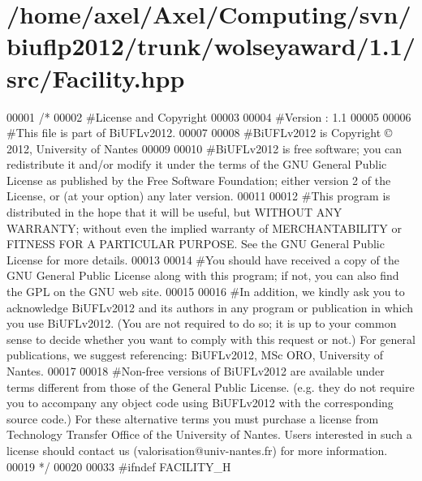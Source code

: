 \hypertarget{Facility_8hpp_source}{\section{/home/axel/\-Axel/\-Computing/svn/biuflp2012/trunk/wolseyaward/1.1/src/\-Facility.hpp}
}

\begin{DoxyCode}
00001 \textcolor{comment}{/*}
00002 \textcolor{comment}{ #License and Copyright}
00003 \textcolor{comment}{ }
00004 \textcolor{comment}{ #Version : 1.1}
00005 \textcolor{comment}{ }
00006 \textcolor{comment}{ #This file is part of BiUFLv2012.}
00007 \textcolor{comment}{ }
00008 \textcolor{comment}{ #BiUFLv2012 is Copyright © 2012, University of Nantes}
00009 \textcolor{comment}{ }
00010 \textcolor{comment}{ #BiUFLv2012 is free software; you can redistribute it and/or modify it under
       the terms of the GNU General Public License as published by the Free Software
       Foundation; either version 2 of the License, or (at your option) any later version.}
00011 \textcolor{comment}{ }
00012 \textcolor{comment}{ #This program is distributed in the hope that it will be useful, but WITHOUT
       ANY WARRANTY; without even the implied warranty of MERCHANTABILITY or FITNESS FOR
       A PARTICULAR PURPOSE. See the GNU General Public License for more details.}
00013 \textcolor{comment}{ }
00014 \textcolor{comment}{ #You should have received a copy of the GNU General Public License along with
       this program; if not, you can also find the GPL on the GNU web site.}
00015 \textcolor{comment}{ }
00016 \textcolor{comment}{ #In addition, we kindly ask you to acknowledge BiUFLv2012 and its authors in
       any program or publication in which you use BiUFLv2012. (You are not required to
       do so; it is up to your common sense to decide whether you want to comply with
       this request or not.) For general publications, we suggest referencing: 
       BiUFLv2012, MSc ORO, University of Nantes.}
00017 \textcolor{comment}{ }
00018 \textcolor{comment}{ #Non-free versions of BiUFLv2012 are available under terms different from
       those of the General Public License. (e.g. they do not require you to accompany any
       object code using BiUFLv2012 with the corresponding source code.) For these
       alternative terms you must purchase a license from Technology Transfer Office of the
       University of Nantes. Users interested in such a license should contact us
       (valorisation@univ-nantes.fr) for more information.}
00019 \textcolor{comment}{ */}
00020  
00033 \textcolor{preprocessor}{#ifndef FACILITY\_H}

\end{DoxyCode}

